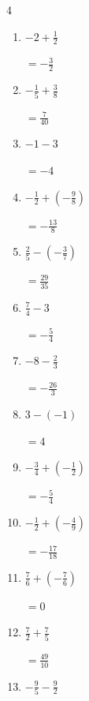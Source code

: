 \begin{multicols}{4}
\begin{enumerate}
  \item $\displaystyle -2 + \frac{1}{2}$

        $\displaystyle =-\frac{3}{2}$

  \item $\displaystyle -\frac{1}{5} + \frac{3}{8}$

        $\displaystyle =\frac{7}{40}$

  \item $\displaystyle -1 - 3$

        $\displaystyle =-4$

  \item $\displaystyle -\frac{1}{2} + \left(-\frac{9}{8}\right)$

        $\displaystyle =-\frac{13}{8}$

  \item $\displaystyle \frac{2}{5} - \left(-\frac{3}{7}\right)$

        $\displaystyle =\frac{29}{35}$

  \item $\displaystyle \frac{7}{4} - 3$

        $\displaystyle =-\frac{5}{4}$

  \item $\displaystyle -8 - \frac{2}{3}$

        $\displaystyle =-\frac{26}{3}$

  \item $\displaystyle 3 - \left(-1\right)$

        $\displaystyle =4$

  \item $\displaystyle -\frac{3}{4} + \left(-\frac{1}{2}\right)$

        $\displaystyle =-\frac{5}{4}$

  \item $\displaystyle -\frac{1}{2} + \left(-\frac{4}{9}\right)$

        $\displaystyle =-\frac{17}{18}$

\columnbreak %

  \item $\displaystyle \frac{7}{6} + \left(-\frac{7}{6}\right)$

        $\displaystyle =0$

  \item $\displaystyle \frac{7}{2} + \frac{7}{5}$

        $\displaystyle =\frac{49}{10}$

  \item $\displaystyle -\frac{9}{5} - \frac{9}{2}$


\end{enumerate}
\end{multicols}
